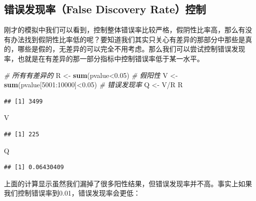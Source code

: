 \documentclass[]{tufte-book}
\newenvironment{Shaded}{}{}
\newcommand{\CommentTok}[1]{\textcolor[rgb]{0.38,0.63,0.69}{\textit{#1}}}
\newcommand{\DecValTok}[1]{\textcolor[rgb]{0.25,0.63,0.44}{#1}}
\newcommand{\FloatTok}[1]{\textcolor[rgb]{0.25,0.63,0.44}{#1}}
\newcommand{\KeywordTok}[1]{\textcolor[rgb]{0.00,0.44,0.13}{\textbf{#1}}}
\newcommand{\NormalTok}[1]{#1}
\newcommand{\OperatorTok}[1]{\textcolor[rgb]{0.40,0.40,0.40}{#1}}
\newcommand{\StringTok}[1]{\textcolor[rgb]{0.25,0.44,0.63}{#1}}
\begin{document}
\hypertarget{ux9519ux8befux53d1ux73b0ux7387false-discovery-rateux63a7ux5236}{%
\subsection{错误发现率（False Discovery Rate）控制}\label{ux9519ux8befux53d1ux73b0ux7387false-discovery-rateux63a7ux5236}}

刚才的模拟中我们可以看到，控制整体错误率比较严格，假阴性比率高，那么有没有办法找到假阴性比率低的呢？要知道我们其实只关心有差异的那部分中那些是真的，哪些是假的，无差异的可以完全不用考虑。那么我们可以尝试控制错误发现率，也就是在有差异的那一部分指标中控制错误率低于某一水平。

\begin{Shaded}
\begin{Highlighting}[]
\CommentTok{# 所有有差异的}
\NormalTok{R <-}\StringTok{ }\KeywordTok{sum}\NormalTok{(pvalue}\OperatorTok{<}\FloatTok{0.05}\NormalTok{)}
\CommentTok{# 假阳性}
\NormalTok{V <-}\StringTok{ }\KeywordTok{sum}\NormalTok{(pvalue[}\DecValTok{5001}\OperatorTok{:}\DecValTok{10000}\NormalTok{]}\OperatorTok{<}\FloatTok{0.05}\NormalTok{)}
\CommentTok{# 错误发现率}
\NormalTok{Q <-}\StringTok{ }\NormalTok{V}\OperatorTok{/}\NormalTok{R}
\NormalTok{R}
\end{Highlighting}
\end{Shaded}

\begin{verbatim}
## [1] 3499
\end{verbatim}

\begin{Shaded}
\begin{Highlighting}[]
\NormalTok{V}
\end{Highlighting}
\end{Shaded}

\begin{verbatim}
## [1] 225
\end{verbatim}

\begin{Shaded}
\begin{Highlighting}[]
\NormalTok{Q}
\end{Highlighting}
\end{Shaded}

\begin{verbatim}
## [1] 0.06430409
\end{verbatim}

上面的计算显示虽然我们漏掉了很多阳性结果，但错误发现率并不高。事实上如果我们控制错误率到0.01，错误发现率会更低：
\end{document}
